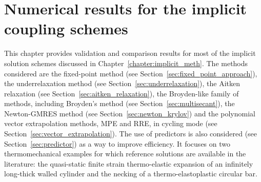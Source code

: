 \chapter{Numerical results for the implicit coupling schemes}

This chapter provides validation and comparison results for most of the implicit solution schemes discussed in Chapter~\ref{chapter:implicit_meth}.
The methods considered are the fixed-point method (see Section~\ref{sec:fixed_point_approach}), the underrelaxation method (see Section~\ref{sec:underrelaxation}), the Aitken relaxation (see Section~\ref{sec:aitken_relaxation}), the Broyden-like family of methods, including Broyden's method (see Section~\ref{sec:multisecant}), the Newton-GMRES method (see Section~\ref{sec:newton_krylov}) and the polynomial vector extrapolation methods, MPE and RRE, in cycling mode (see Section~\ref{sec:vector_extrapolation}).
The use of predictors is also considered (see Section~\ref{sec:predictor}) as a way to improve efficiency.
It focuses on two thermomechanical examples for which reference solutions are available in the literature: the quasi-static finite strain thermo-elastic expansion of an infinitely long-thick walled cylinder and the necking of a thermo-elastoplastic circular bar.



